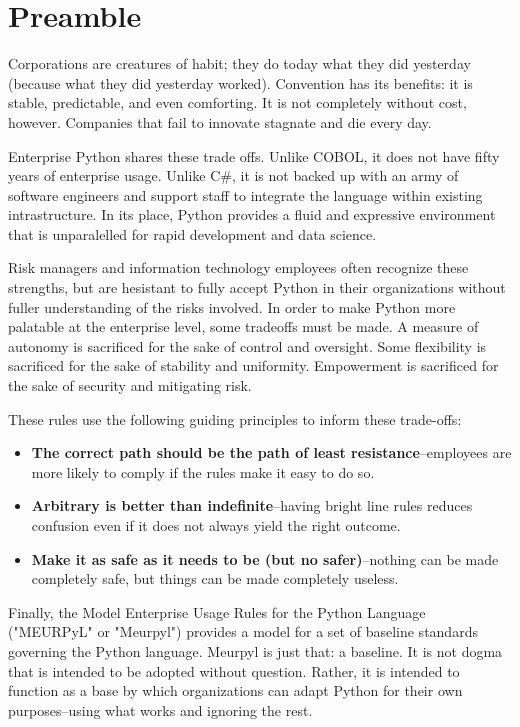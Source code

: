 

\section{Preamble}

Corporations are creatures of habit; they do today what they did yesterday (because what they did yesterday worked). Convention has its benefits: it is stable, predictable, and even comforting. It is not completely without cost, however. Companies that fail to innovate stagnate and die every day.

Enterprise Python shares these trade offs. Unlike COBOL, it does not have fifty years of enterprise usage. Unlike C\#, it is not backed up with an army of software engineers and support staff to integrate the language within existing intrastructure. In its place, Python provides a fluid and expressive environment that is unparalelled for rapid development and data science.

Risk managers and information technology employees often recognize these strengths, but are hesistant to fully accept Python in their organizations without fuller understanding of the risks involved. In order to make Python more palatable at the enterprise level, some tradeoffs must be made. A measure of autonomy is sacrificed for the sake of control and oversight. Some flexibility is sacrificed for the sake of stability and uniformity. Empowerment is sacrificed for the sake of security and mitigating risk. 

These rules use the following guiding principles to inform these trade-offs:

\begin{itemize}
	\item \textbf{The correct path should be the path of least resistance}--employees are more likely to comply if the rules make it easy to do so.
	\item \textbf{Arbitrary is better than indefinite}--having bright line rules reduces confusion even if it does not always yield the right outcome.
	\item \textbf{Make it as safe as it needs to be (but no safer)}--nothing can be made completely safe, but things can be made completely useless.
\end{itemize}

Finally, the Model Enterprise Usage Rules for the Python Language ("MEURPyL" or "Meurpyl") provides a model for a set of baseline standards governing the Python language. Meurpyl is just that: a baseline. It is not dogma that is intended to be adopted without question. Rather, it is intended to function as a base by which organizations can adapt Python for their own purposes--using what works and ignoring the rest.
